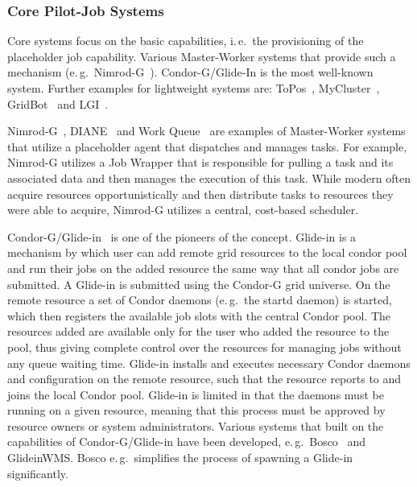 \documentclass{sig-alternate}
\begin{document}
\subsubsection*{Core Pilot-Job Systems}

Core \pilotjob systems focus on the basic \pilot capabilities, i.\,e.\ the
provisioning of the placeholder job capability. Various Master-Worker systems
that provide such a mechanism (e.\,g.\
Nimrod-G~\cite{10.1109/HPC.2000.846563}). Condor-G/Glide-In is the most
well-known \pilotjob system. Further examples for lightweight \pilotjob
systems are: ToPos~\cite{topos},
MyCluster~\cite{Walker:2007:PAC:1285840.1285848},
GridBot~\cite{Silberstein:2009:GEB:1654059.1654071} and LGI~\cite{lgi}.

Nimrod-G~\cite{10.1109/HPC.2000.846563}, DIANE~\cite{diane-thesis} and Work
Queue~\cite{workqueue-pyhpc2011} are examples of Master-Worker systems that
utilize a placeholder agent that dispatches and manages tasks. For example,
Nimrod-G utilizes a Job Wrapper that is responsible for pulling a task and its
associated data and then manages the execution of this task. While modern
\pilotjobs often acquire resources opportunistically and then distribute tasks
to resources they were able to acquire, Nimrod-G utilizes a central,
cost-based scheduler.

Condor-G/Glide-in~\cite{condor-g} is one of the pioneers of the \pilotjob
concept. Glide-in is a mechanism by which user can add remote grid resources
to the local condor pool and run their jobs on the added resource the same way
that all condor jobs are submitted. A Glide-in is submitted using the Condor-G
grid universe. On the remote resource a set of Condor daemons (e.\,g.\ the
startd daemon) is started, which then registers the available job slots with
the central Condor pool. The resources added are available only for the user
who added the resource to the pool, thus giving complete control over the
resources for managing jobs without any queue waiting time. Glide-in installs
and executes necessary Condor daemons and configuration on the remote
resource, such that the resource reports to and joins the local Condor pool.
Glide-in is limited in that the daemons must be running on a given resource,
meaning that this process must be approved by resource owners or system
administrators. Various systems that built on the \pilot capabilities of 
Condor-G/Glide-in have been developed, e.\,g.\ Bosco~\cite{bosco} and 
GlideinWMS. Bosco e.\,g.\ simplifies the process of spawning a Glide-in 
significantly.
\end{document}
